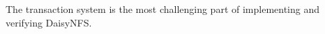 The transaction system is the most challenging part of implementing and
verifying DaisyNFS.








%

